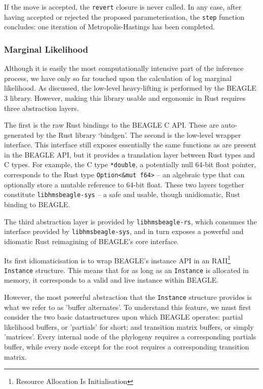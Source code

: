 \documentclass[10pt,journal,compsoc]{IEEEtran}
\begin{document}
If the move is accepted, the \texttt{revert} closure is never called. In any case, after having accepted or rejected the proposed parameterisation, the \texttt{step} function concludes: one iteration of Metropolis-Hastings has been completed.


\subsubsection{Marginal Likelihood}
  
Although it is easily the most computationally intensive part of the inference process, we have only so far touched upon the calculation of log marginal likelihood. As discussed, the low-level heavy-lifting is performed by the BEAGLE 3 library. However, making this library usable and ergonomic in Rust requires three abstraction layers. 

The first is the raw Rust bindings to the BEAGLE C API. These are auto-generated by the Rust library `bindgen'. The second is the low-level wrapper interface. This interface still exposes essentially the same functions as are present in the BEAGLE API, but it provides a translation layer between Rust types and C types. For example, the C type \texttt{*double}, a potentially null 64-bit float pointer, corresponds to the Rust type \texttt{Option<\&mut f64>} -- an algebraic type that can optionally store a mutable reference to 64-bit float. These two layers together constitute \texttt{libhmsbeagle-sys} -- a safe and usable, though unidiomatic, Rust binding to BEAGLE.

The third abstraction layer is provided by \texttt{libhmsbeagle-rs}, which consumes the interface provided by \texttt{libhmsbeagle-sys}, and in turn exposes a powerful and idiomatic Rust reimagining of BEAGLE's core interface.

Its first idiomaticisation is to wrap BEAGLE's instance API in an RAII\footnote{Resource Allocation Is Initialisation} \texttt{Instance} structure. This means that for as long as an \texttt{Instance} is allocated in memory, it corresponds to a valid and live instance within BEAGLE.

However, the most powerful abstraction that the \texttt{Instance} structure provides is what we refer to as 'buffer alternates'. To understand this feature, we must first consider the two basic datastructures upon which BEAGLE operates: partial likelihood buffers, or 'partials' for short; and transition matrix buffers, or simply 'matrices'. Every internal node of the phylogeny requires a corresponding partials buffer, while every node except for the root requires a corresponding transition matrix.
\end{document}

